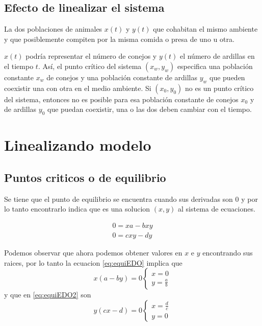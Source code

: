 \documentclass{report}
\begin{document}
\subsection*{Efecto de linealizar el sistema}

La dos poblaciones de animales $x(t)$ y $y(t)$ que cohabitan el mismo ambiente y que
posiblemente compiten por la misma comida o presa de uno u otra.

 $x(t)$ podría representar el número de conejos y $y(t)$ el número de ardillas en el tiempo $t$. Así, el punto crítico del sistema $(x_w , y_w )$ especifica una población constante $x_w$ de conejos y una población constante de ardillas $y_w$ que pueden coexistir una con otra en el medio ambiente. Si $(x_0 , y_0 )$ no es un punto crítico del sistema, entonces no es posible para esa población constante de conejos $x_0$ y de ardillas $y_0$ que puedan coexistir, una o las dos deben cambiar con el tiempo.

\section{Linealizando modelo}
\subsection{Puntos criticos o de equilibrio}
Se tiene que el punto de equilibrio se encuentra cuando sus derivadas son 0 y por lo tanto encontrarlo indica que es una solucion $(x,y)$ al sistema de ecuaciones.

\begin{align}
0= xa-bxy \label{eq:equiEDO} \\
0= cxy-dy \label{eq:equiEDO2}
\end{align}

Podemos observar que ahora podemos obtener valores en $x$ e $y$ encontrando sus raices, por lo tanto la ecuacion \ref{eq:equiEDO} implica que
\begin{equation}
x(a-by)= 0
\begin{cases}
x=0\\
y=\frac{a}{b}
\end{cases}
\end{equation}
y que en \ref{eq:equiEDO2} son
\begin{equation}
y(cx-d)= 0
\begin{cases}
x=\frac{d}{c}\\
y=0
\end{cases}
\end{equation}
\end{document}
